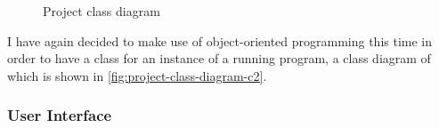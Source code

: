 \documentclass[11pt]{article}
\begin{document}
                \begin{figure}[!ht]
                    \centering
                    \caption{Project class diagram}
                    \label{fig:project-class-diagram-c2}
                \end{figure}

                I have again decided to make use of object-oriented programming this time in order to have a class for an instance of a running program, a class diagram of which is shown in \autoref{fig:project-class-diagram-c2}. 

            \subsubsection{User Interface} 


                
\end{document}
